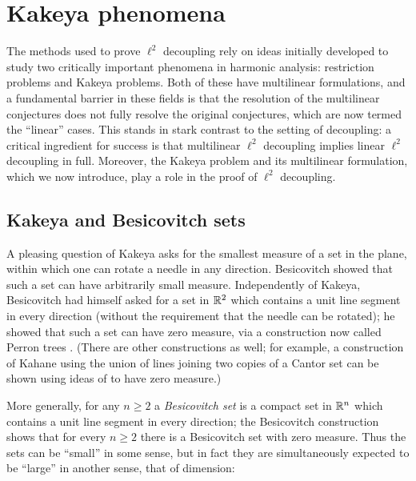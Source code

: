 \documentclass[brochure,english,12pt]{bourbaki}%
\begin{document}
\section{Kakeya phenomena}\label{sec_Kakeya}
The methods used to prove $\ell^2$ decoupling rely on ideas initially developed to study two critically important phenomena in harmonic analysis: restriction problems and Kakeya problems. Both of these have multilinear formulations, and a fundamental barrier in these fields is that the resolution of the multilinear conjectures does not fully resolve the original conjectures, which are now termed the ``linear'' cases. This stands in stark contrast to the setting of decoupling: a critical ingredient for success is that multilinear $\ell^2$ decoupling implies linear $\ell^2$ decoupling in full. Moreover, the Kakeya problem and its multilinear formulation, which we now introduce, play a role in the proof of $\ell^2$ decoupling.


\subsection{Kakeya and Besicovitch sets}
A pleasing question of Kakeya \cite{Kak17,FujKak17} asks for the smallest measure of a set in the plane, within which one can rotate a needle in any direction.  Besicovitch \cite{Bes28}  showed that such a set can have arbitrarily small measure. 
Independently of Kakeya, Besicovitch had himself asked for a set in $\mathbb{R}^2$ which contains a unit line segment in every direction (without the requirement that the needle can be rotated); he showed \cite{Bes19} that such a set can have zero measure, via a construction now called Perron trees \cite{Per28}. (There are other constructions as well; for example, a construction of Kahane \cite{Kah69} using the union of lines joining two copies of a Cantor set  can be shown using ideas of \cite{PSS03} to have zero measure.)

More generally,  for any $n \geq 2$ a \emph{Besicovitch set} is a compact set in $\mathbb{R}^n$ which contains a unit line segment in every direction; the Besicovitch construction shows that for every $n \geq 2$ there is a Besicovitch set with zero measure. Thus the sets can be ``small'' in some sense, but in fact they are simultaneously expected to be ``large'' in another sense, that of dimension:
\end{document}
